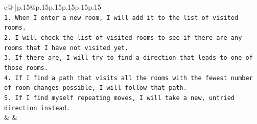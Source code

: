 \documentclass{article}
\begin{document}
{\begin{supertabular}{c@{$\;$}|p{.15\linewidth}@{}p{.15\linewidth}p{.15\linewidth}p{.15\linewidth}p{.15\linewidth}p{.15\linewidth}}
{{{\\ 
\texttt{1. When I enter a new room, I will add it to the list of visited rooms.} \\
\texttt{2. I will check the list of visited rooms to see if there are any rooms that I have not visited yet.} \\
\texttt{3. If there are, I will try to find a direction that leads to one of those rooms.} \\
\texttt{4. If I find a path that visits all the rooms with the fewest number of room changes possible, I will follow that path.} \\
\texttt{5. If I find myself repeating moves, I will take a new, untried direction instead.} \\
            }
        }
    }
    & & \\ \\

\end{supertabular}
}
\end{document}
